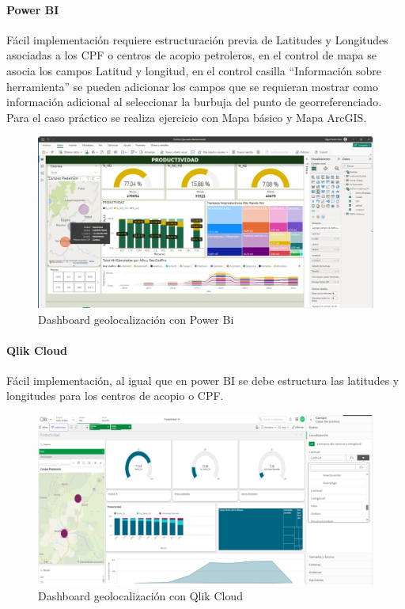 \documentclass[
  11pt,
  bookmarksnumbered]{article}
\begin{document}
\hypertarget{power-bi-2}{%
\paragraph{Power BI}\label{power-bi-2}}

Fácil implementación requiere estructuración previa de Latitudes y Longitudes asociadas a los CPF o centros de acopio petroleros, en el control de mapa se asocia los campos Latitud y longitud, en el control casilla ``Información sobre herramienta'' se pueden adicionar los campos que se requieran mostrar como información adicional al seleccionar la burbuja del punto de georreferenciado. Para el caso práctico se realiza ejercicio con Mapa básico y Mapa ArcGIS.

\begin{figure}

{\centering \includegraphics[width=5.78in]{media 2/image18} 

}

\caption{Dashboard geolocalización con Power Bi}\label{fig:unnamed-chunk-24}
\end{figure}

\hypertarget{qlik-cloud-2}{%
\paragraph{Qlik Cloud}\label{qlik-cloud-2}}

Fácil implementación, al igual que en power BI se debe estructura las latitudes y longitudes para los centros de acopio o CPF.

\begin{figure}

{\centering \includegraphics[width=5.49in]{media 2/image20} 

}

\caption{Dashboard geolocalización con Qlik Cloud}\label{fig:unnamed-chunk-25}
\end{figure}
\end{document}
